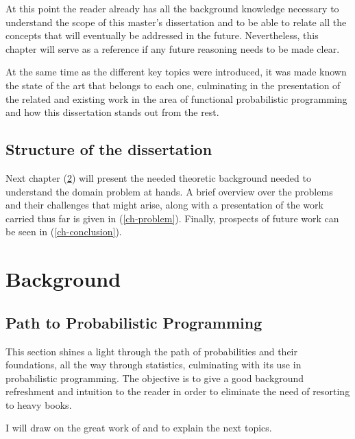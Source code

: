 \documentclass[
  oneside,
  11pt, a4paper,
  footinclude=true,
  headinclude=true,
  cleardoublepage=empty
]{scrbook}
\theoremstyle{definition}
\theoremstyle{definition}
\begin{document}
    At this point the reader already has all the background knowledge necessary to understand the scope of this master's dissertation and to be able to relate all the concepts that will eventually be addressed in the future. Nevertheless, this chapter will serve as a reference if any future reasoning needs to be made clear.
    
    At the same time as the different key topics were introduced, it was made known the state of the art that belongs to each one, culminating in the presentation of the related and existing work in the area of functional probabilistic programming and how this dissertation stands out from the rest.          
    
    \section{Structure of the dissertation}
    
    Next chapter (\ref{ch-background}) will present the needed theoretic background needed to understand the domain problem at hands. A brief overview over the problems and their challenges that might arise, along with a presentation of the work carried thus far is given in (\ref{ch-problem}). Finally, prospects of future work can be seen in (\ref{ch-conclusion}).
    
    \chapter{Background}\label{ch-background}
    
        \section{Path to Probabilistic Programming}\label{s-2-2}
    
        This section shines a light through the path of probabilities and their foundations, all the way through statistics, culminating with its use in probabilistic programming. The objective is to give a good background refreshment and intuition to the reader in order to eliminate the need of resorting to heavy books.
        
        I will draw on the great work of \cite{CaseBerg:01} and \cite{RePEc:bes:amstat:v:59:y:2005:m:august:p:276-276} to explain the next topics.
         
\end{document}

